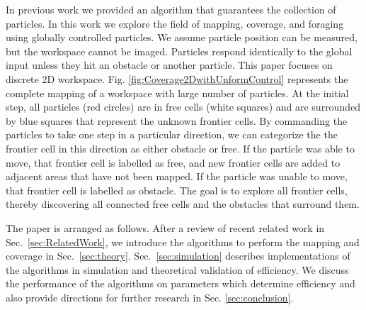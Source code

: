 In previous work \cite{mahadev2016collecting} we provided an algorithm that guarantees the collection of particles.
 In this work we explore the field of mapping, coverage, and foraging using globally controlled particles. 
 We assume particle position can be measured, but the workspace cannot be imaged. 
 Particles respond identically to the global input unless they hit an obstacle or another particle. 
 This paper focuses on discrete 2D workspace.
Fig. \ref{fig:Coverage2DwithUnformControl} represents the complete mapping of a workspace with large number of particles.  
At the initial step, all  particles (red circles) are in free cells (white squares) and are surrounded by blue squares that represent the unknown frontier cells.
By commanding the particles to take one step in a particular direction, we can categorize the the frontier cell in this direction as either obstacle or free.
 If the particle was able to move, that frontier cell is labelled as free, and new frontier cells are added to adjacent areas that have not been mapped.
 If the particle was unable to move, that frontier cell is labelled as obstacle.
The goal is to explore all  frontier cells, thereby discovering all connected free cells and the obstacles that surround them. 

The paper is arranged as follows. 
After a review of recent related work in Sec.~\ref{sec:RelatedWork}, we introduce the algorithms to perform the mapping and coverage in Sec.~\ref{sec:theory}.
 Sec.~\ref{sec:simulation} describes implementations of the algorithms in simulation and theoretical validation of efficiency. 
  We discuss the performance of the algorithms on parameters which determine efficiency and also provide directions for further research in Sec.  \ref{sec:conclusion}.

